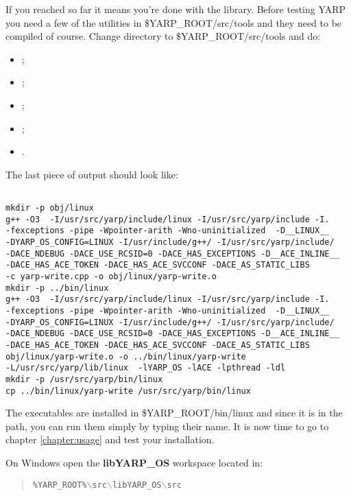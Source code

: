 If you reached so far it means you're done with the library. Before testing YARP you need a few of the utilities in \$YARP\_ROOT/src/tools and they need to be compiled of course. Change directory to \$YARP\_ROOT/src/tools and do:
\begin{itemize}
\item {};
\item {};
\item {};
\item {};
\item {}.
\end{itemize}

The last piece of output should look like:
\begin{verbatim}

mkdir -p obj/linux
g++ -O3  -I/usr/src/yarp/include/linux -I/usr/src/yarp/include -I.  
-fexceptions -pipe -Wpointer-arith -Wno-uninitialized  -D__LINUX__ 
-DYARP_OS_CONFIG=LINUX -I/usr/include/g++/ -I/usr/src/yarp/include/ 
-DACE_NDEBUG -DACE_USE_RCSID=0 -DACE_HAS_EXCEPTIONS -D__ACE_INLINE__ 
-DACE_HAS_ACE_TOKEN -DACE_HAS_ACE_SVCCONF -DACE_AS_STATIC_LIBS   
-c yarp-write.cpp -o obj/linux/yarp-write.o
mkdir -p ../bin/linux
g++ -O3  -I/usr/src/yarp/include/linux -I/usr/src/yarp/include -I.  
-fexceptions -pipe -Wpointer-arith -Wno-uninitialized  -D__LINUX__ 
-DYARP_OS_CONFIG=LINUX -I/usr/include/g++/ -I/usr/src/yarp/include/ 
-DACE_NDEBUG -DACE_USE_RCSID=0 -DACE_HAS_EXCEPTIONS -D__ACE_INLINE__ 
-DACE_HAS_ACE_TOKEN -DACE_HAS_ACE_SVCCONF -DACE_AS_STATIC_LIBS   
obj/linux/yarp-write.o -o ../bin/linux/yarp-write 
-L/usr/src/yarp/lib/linux  -lYARP_OS -lACE -lpthread -ldl
mkdir -p /usr/src/yarp/bin/linux
cp ../bin/linux/yarp-write /usr/src/yarp/bin/linux

\end{verbatim}

The executables are installed in \$YARP\_ROOT/bin/linux and since it is in the path, you can run them simply by typing their name. It is now time to go to chapter \ref{chapter:usage} and test your installation. 

\vspace{.5cm}
On Windows open the {\bf libYARP\_OS} workspace located in:

\begin{quote}
{\tt \%YARP\_ROOT\%$\backslash$src$\backslash$libYARP\_OS$\backslash$src}
\end{quote}

